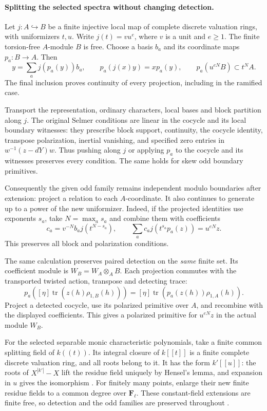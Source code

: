 \paragraph{Splitting the selected spectra without changing detection.}
Let $j:A\hookrightarrow B$ be a finite injective local map of complete
discrete valuation rings, with uniformizers $t,u$. Write
$j(t)=vu^e$, where $v$ is a unit and $e\geq1$.
The finite torsion-free $A$-module $B$ is free. Choose a basis $b_a$
and its coordinate maps $p_a:B\to A$. Then
\[
 y=\sum_a j(p_a(y))b_a,
 \qquad p_a(j(x)y)=xp_a(y),
 \qquad p_a(u^{eN}B)\subset t^NA.
\]
The final inclusion proves continuity of every projection, including
in the ramified case.

Transport the representation, ordinary characters, local bases and
block partition along $j$. The original Selmer conditions are linear
in the cocycle and its local boundary witnesses: they prescribe block
support, continuity, the cocycle identity, transpose polarization,
inertial vanishing, and specified zero entries in
$w^{-1}(z-dY)w$. Thus pushing along $j$ or applying $p_a$ to the
cocycle and its witnesses preserves every condition. The same holds
for skew odd boundary primitives.

Consequently the given odd family remains independent modulo
boundaries after extension: project a relation to each $A$-coordinate.
It also continues to generate up to a power of the new uniformizer.
Indeed, if the projected identities use exponents $s_a$, take
$N=\max_a s_a$ and combine them with coefficients
\[
                 c_a=v^{-N}b_a j(t^{N-s_a}),
 \qquad
             \sum_a c_a j(t^{s_a}p_a(z))=u^{eN}z.
\]
This preserves all block and polarization conditions.

The same calculation preserves paired detection on the \emph{same}
finite set. Its coefficient module is
$W_B=W_A\otimes_A B$. Each projection commutes with the transported
twisted action, transpose and detecting trace:
\[
 p_a\!\left([\eta]\operatorname{tr}(z(h)\rho_{1,B}(h))\right)
    =[\eta]\operatorname{tr}(p_a(z(h))\rho_{1,A}(h)).
\]
Project a detected cocycle, use its polarized primitive over $A$, and
recombine with the displayed coefficients. This gives a polarized
primitive for $u^{eN}z$ in the actual module $W_B$.

For the selected separable monic characteristic polynomials, take a
finite common splitting field of $k((t))$. Its integral closure of
$k[[t]]$ is a finite complete discrete valuation ring, and all roots
belong to it. It has the form $k'[[u]]$: the roots of
$X^{|k'|}-X$ lift the residue field uniquely by Hensel's lemma, and
expansion in $u$ gives the isomorphism
\cite{stacks-selmer-dvr-extension,stacks-selmer-coefficient-field}.
For finitely many points, enlarge their new finite residue fields to
a common degree over $\mathbf F_\ell$. These constant-field
extensions are finite free, so detection and the odd families are
preserved throughout \cite{alpo-coefficient-extension}.

